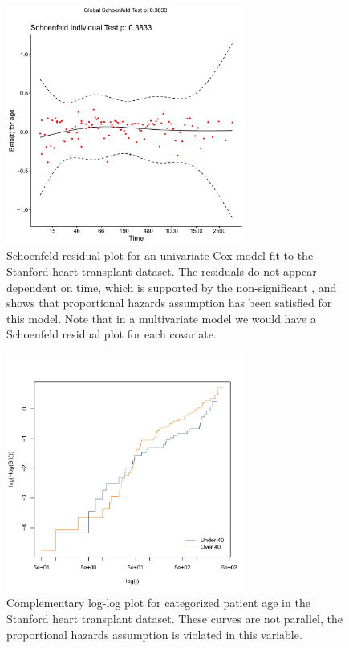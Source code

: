 \begin{figure}[H]
\centering
\includegraphics[width=0.7\textwidth]{figures/survival/stanford_cox_age_schoenfeld_residuals}
\vspace{0.2cm}
\caption{
Schoenfeld residual plot for
an univariate Cox model fit to the Stanford heart transplant dataset.
The residuals do not appear dependent on time,
which is supported by the non-significant \pvalue,
and shows that proportional hazards assumption
has been satisfied for this model.
Note that in a multivariate model we
would have a Schoenfeld residual plot for
each covariate.
}
\label{fig:cox:schoenfeld_residuals}
\end{figure}

\begin{figure}[H]
\centering
\includegraphics[width=0.7\textwidth]{figures/survival/stanford_cloglog}
\vspace{0.2cm}
\caption{
Complementary log-log plot for categorized patient age
in the Stanford heart transplant dataset.
These curves are not parallel,
the proportional hazards assumption is violated in this variable.
}
\label{fig:stanford_cloglog}
\end{figure}

